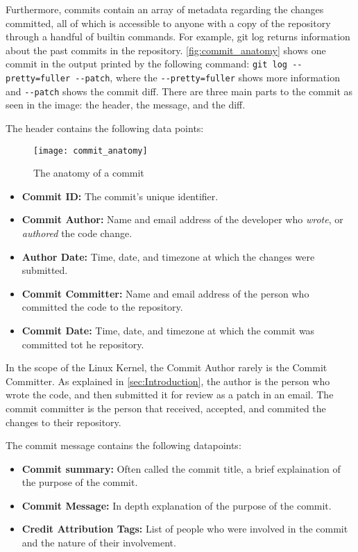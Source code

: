 Furthermore, commits contain an array of metadata regarding the changes committed, all of which is accessible to anyone with a copy of the repository through a handful of builtin commands. For example, git log returns information about the past commits in the repository. \autoref{fig:commit_anatomy} shows one commit in the output printed by the following command: \texttt{git log -{}-pretty=fuller -{}-patch}, where the \texttt{-{}-pretty=fuller} shows more information and \texttt{-{}-patch} shows the commit diff. There are three main parts to the commit as seen in the image: the header, the  message, and the diff.

The header contains the following data points:

\begin{figure}[htb]
\centering
\texttt{[image: commit\_anatomy]}
\caption{The anatomy of a commit}
\label{fig:commit_anatomy}
\end{figure}

\begin{itemize}
	\item \textbf{Commit ID:} The commit's unique identifier.
	\item \textbf{Commit Author:} Name and email address of the developer who \textit{wrote}, or \textit{authored} the code change.
	\item \textbf{Author Date:} Time, date, and timezone at which the changes were submitted.
	\item \textbf{Commit Committer:} Name and email address of the person who committed the code to the repository.
	\item \textbf{Commit Date:} Time, date, and timezone at which the commit was committed tot he repository.
\end{itemize}

In the scope of the Linux Kernel, the Commit Author rarely is the Commit Committer. As explained in \autoref{sec:Introduction}, the author is the person who wrote the code, and then submitted it for review as a patch in an email. The commit committer is the person that received, accepted, and commited the changes to their repository.

The commit message contains the following datapoints:

\begin{itemize}
	\item \textbf{Commit summary:} Often called the commit title, a brief explaination of the purpose of the commit. 
	\item \textbf{Commit Message:} In depth explanation of the purpose of the commit.
	\item \textbf{Credit Attribution Tags:} List of people who were involved in the commit and the nature of their involvement. 
\end{itemize}

